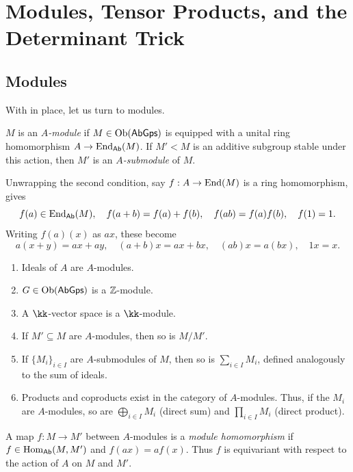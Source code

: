 \documentclass[11pt,a4paper]{article}
\begin{document}
\section*{Modules, Tensor Products, and the Determinant Trick}
\subsection{Modules}
With  in place, let us turn to modules.
\setcounter{definition}{3}\begin{definition}
$M$ is an \emph{$A$-module} if $M\in\operatorname{Ob}(\mathsf{AbGps})$ is equipped with a unital ring homomorphism $A\to\operatorname{End}_{\mathsf{Ab}}(M)$. If $M'<M$ is an additive subgroup stable under this action, then $M'$ is an \emph{$A$-submodule} of $M$.
\end{definition}
\begin{remark}
Unwrapping the second condition, say $f:A\to\operatorname{End}(M)$ is a ring homomorphism, gives
\[
f(a)\in\operatorname{End}_{\mathsf{Ab}}(M),\quad f(a+b)=f(a)+f(b),\quad
f(ab)=f(a)f(b),\quad f(1)=1.
\]
Writing $f(a)(x)$ as $ax$, these become
\[
a(x+y)=ax+ay,\quad(a+b)x=ax+bx,\quad(ab)x=a(bx),\quad1x=x.
\]
\end{remark}
\setcounter{example}{3}\begin{example}
\begin{enumerate}[label=(\roman*)]
\setcounter{enumi}{0}\item Ideals of $A$ are $A$-modules.
\setcounter{enumi}{1}\item $G\in\operatorname{Ob}(\mathsf{AbGps})$ is a $\mathbb{Z}$-module.
\setcounter{enumi}{2}\item A $\kk$-vector space is a $\kk$-module.
\setcounter{enumi}{3}\item If $M'\subseteq M$ are $A$-modules, then so is $M/M'$.
\setcounter{enumi}{4}\item If $\{M_i\}_{i\in I}$ are $A$-submodules of $M$, then so is $\sum_{i\in I}M_i$, defined analogously to the sum of ideals.
\setcounter{enumi}{5}\item Products and coproducts exist in the category of $A$-modules. Thus, if the $M_i$ are $A$-modules, so are $\bigoplus_{i\in I}M_i$ (direct sum) and $\prod_{i\in I}M_i$ (direct product).
\end{enumerate}
\end{example}
\setcounter{definition}{4}\begin{definition}
A map $f:M\to M'$ between $A$-modules is a \emph{module homomorphism} if
$f\in\operatorname{Hom}_{\mathsf{Ab}}(M,M')$ and $f(ax)=af(x)$. Thus $f$ is equivariant with respect to the action of $A$ on $M$ and $M'$.
\end{definition}
\end{document}
